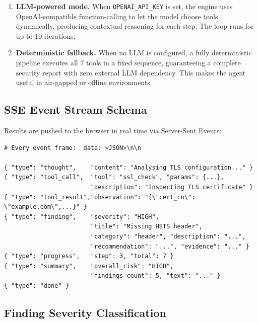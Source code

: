 \documentclass[12pt,a4paper]{article}
\begin{document}
\begin{enumerate}
  \item \textbf{LLM-powered mode.} When \texttt{OPENAI\_API\_KEY} is set, the engine uses
        OpenAI-compatible function-calling to let the model choose tools dynamically, producing
        contextual reasoning for each step. The loop runs for up to 10 iterations.

  \item \textbf{Deterministic fallback.} When no LLM is configured, a fully deterministic
        pipeline executes all 7 tools in a fixed sequence, guaranteeing a complete security
        report with zero external LLM dependency. This makes the agent useful in air-gapped
        or offline environments.
\end{enumerate}

\subsection{SSE Event Stream Schema}

Results are pushed to the browser in real time via Server-Sent Events:

\begin{lstlisting}[style=pythonstyle, caption=SSE event types and payload shapes]
# Every event frame:  data: <JSON>\n\n

{ "type": "thought",    "content": "Analysing TLS configuration..." }
{ "type": "tool_call",  "tool": "ssl_check", "params": {...},
                        "description": "Inspecting TLS certificate" }
{ "type": "tool_result","observation": "{\"cert_cn\": \"example.com\",...}" }
{ "type": "finding",    "severity": "HIGH",
                        "title": "Missing HSTS header",
                        "category": "header", "description": "...",
                        "recommendation": "...", "evidence": "..." }
{ "type": "progress",   "step": 3, "total": 7 }
{ "type": "summary",    "overall_risk": "HIGH",
                        "findings_count": 5, "text": "..." }
{ "type": "done" }
\end{lstlisting}

\subsection{Finding Severity Classification}
\end{document}
